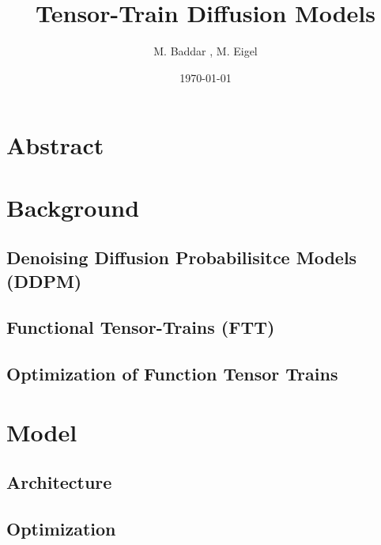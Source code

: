 \documentclass[11pt]{article}
\title{Tensor-Train Diffusion Models }
\author{M. Baddar , M. Eigel}
\date{\today}
\begin{document}
    \maketitle

    \section{Abstract}\label{sec:abstract}
    

    \section{Background}\label{sec:background}

    \subsection{Denoising Diffusion Probabilisitce Models (DDPM)}\label{subsec:ddpm}
    

    \subsection{Functional Tensor-Trains (FTT)}\label{subsec:functional-tensor-trains}
    

    \subsection{Optimization of Function Tensor Trains}\label{subsec:optimization-of-function-tensor-trains}
    

    \section{Model}\label{sec:proposed-model}

    \subsection{Architecture}\label{subsec:architecture}
    

    \subsection{Optimization}\label{subsec:optimization}
    
\end{document}
